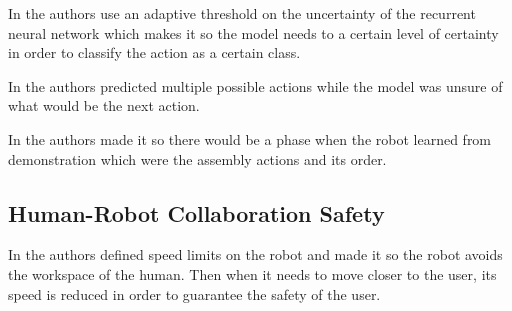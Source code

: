 In \cite{Canuto2021} the authors use an adaptive threshold on the uncertainty of the recurrent neural network which makes it so the model needs to a certain level of certainty in order to classify the action as a certain class.

In \cite{Schydlo2018} the authors predicted multiple possible actions while the model was unsure of what would be the next action.

In \cite{Zhang2022} the authors made it so there would be a phase when the robot learned from demonstration which were the assembly actions and its order.

\subsection{Human-Robot Collaboration Safety}

In \cite{Zhang2022} the authors defined speed limits on the robot and made it so the robot avoids the workspace of the human. Then when it needs to move closer to the user, its speed is reduced in order to guarantee the safety of the user.

